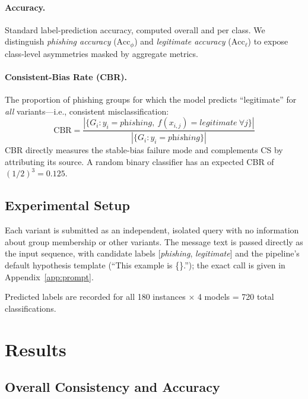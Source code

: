\documentclass[11pt]{article}
\begin{document}
\paragraph{Accuracy.} Standard label-prediction accuracy, computed overall and per class. We distinguish \textit{phishing accuracy} ($\text{Acc}_\phi$) and \textit{legitimate accuracy} ($\text{Acc}_\ell$) to expose class-level asymmetries masked by aggregate metrics.

\paragraph{Consistent-Bias Rate (CBR).} The proportion of phishing groups for which the model predicts ``legitimate'' for \textit{all} variants---i.e., consistent misclassification:
\begin{equation}
  \text{CBR} = \frac{|\{G_i : y_i = \textit{phishing},\ f(x_{i,j}) = \textit{legitimate}\ \forall j\}|}{|\{G_i : y_i = \textit{phishing}\}|}
  \label{eq:cbr}
\end{equation}
CBR directly measures the stable-bias failure mode and complements CS by attributing its source. A random binary classifier has an expected CBR of $(1/2)^3 = 0.125$.

\subsection{Experimental Setup}

Each variant is submitted as an independent, isolated query with no information about group membership or other variants. The message text is passed directly as the input sequence, with candidate labels [\textit{phishing}, \textit{legitimate}] and the pipeline's default hypothesis template (``This example is \{\}.''); the exact call is given in Appendix~\ref{app:prompt}.

Predicted labels are recorded for all 180 instances $\times$ 4 models = 720 total classifications.

\section{Results}

\subsection{Overall Consistency and Accuracy}
\label{sec:overall}
\end{document}
